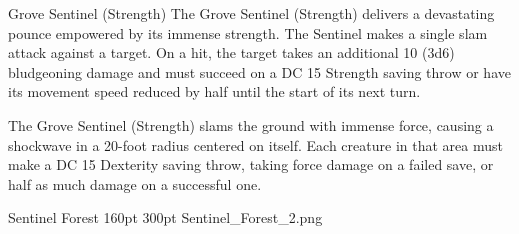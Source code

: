 \begin{DndMonster}[width=0.5\textwidth +0.5em]{Grove Sentinel (Strength)}
    The Grove Sentinel (Strength) delivers a devastating pounce empowered by its immense strength. The Sentinel makes a single slam attack against a target. On a hit, the target takes an additional 10 (3d6) bludgeoning damage and must succeed on a DC 15 Strength saving throw or have its movement speed reduced by half until the start of its next turn.
    
	The Grove Sentinel (Strength) slams the ground with immense force, causing a shockwave in a 20-foot radius centered on itself. Each creature in that area must make a DC 15 Dexterity saving throw, taking  force damage on a failed save, or half as much damage on a successful one.
      
\end{DndMonster}

%
%


\MonsterBannerGraphic%
	{Sentinel Forest}%
	{160pt}%
	{300pt}%
	{Sentinel_Forest_2.png}%
	{}%
%

